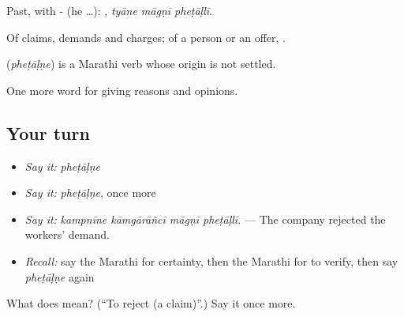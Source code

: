 Past, with - (he …):   , \emph{tyāne māgṇī pheṭāḷlī}.

Of claims, demands and charges; of a person or an offer, .

\begin{cousinweb}
\textbf{} (\emph{pheṭāḷṇe}) is a Marathi verb whose origin is not settled.
\end{cousinweb}

\begin{grammarlens}[title={What you've built}]
One more word for giving reasons and opinions.
\end{grammarlens}

\subsection*{Your turn}
\begin{itemize}
\raggedright
  \item \emph{Say it:} \emph{pheṭāḷṇe}
  \item \emph{Say it:} \emph{pheṭāḷṇe}, once more
  \item \emph{Say it:} \emph{kampnīne kāmgārāñcī māgṇī pheṭāḷlī.} — The company rejected the workers' demand.
  \item \emph{Recall:} say the Marathi for certainty, then the Marathi for to verify, then say \emph{pheṭāḷṇe} again
\end{itemize}

\begin{tcolorbox}[breakable,colback=teal!4,colframe=teal!35!black,title={Before you move on}]
What does  mean? (\textquotedblleft{}To reject (a claim)\textquotedblright{}.) Say it once more.
\end{tcolorbox}
